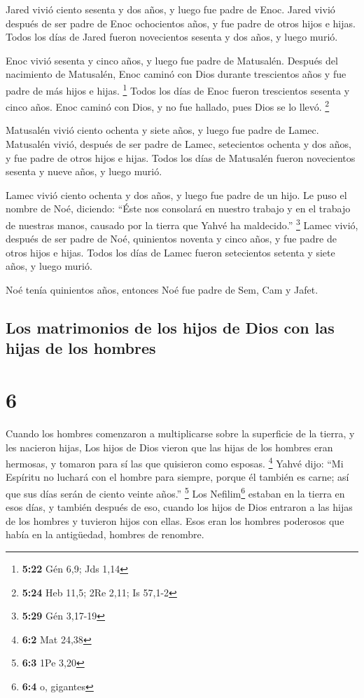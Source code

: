  Jared vivió ciento sesenta y dos años, y luego fue padre
de Enoc.  Jared vivió después de ser padre de Enoc
ochocientos años, y fue padre de otros hijos e hijas. 
Todos los días de Jared fueron novecientos sesenta y dos años, y luego
murió.

 Enoc vivió sesenta y cinco años, y luego fue padre de
Matusalén.  Después del nacimiento de Matusalén, Enoc
caminó con Dios durante trescientos años y fue padre de más hijos e
hijas. \footnote{\textbf{5:22} Gén 6,9; Jds 1,14}  Todos
los días de Enoc fueron trescientos sesenta y cinco años.
 Enoc caminó con Dios, y no fue hallado, pues Dios se lo
llevó. \footnote{\textbf{5:24} Heb 11,5; 2Re 2,11; Is 57,1-2}

 Matusalén vivió ciento ochenta y siete años, y luego fue
padre de Lamec.  Matusalén vivió, después de ser padre de
Lamec, setecientos ochenta y dos años, y fue padre de otros hijos e
hijas.  Todos los días de Matusalén fueron novecientos
sesenta y nueve años, y luego murió.

 Lamec vivió ciento ochenta y dos años, y luego fue padre
de un hijo.  Le puso el nombre de Noé, diciendo: ``Éste
nos consolará en nuestro trabajo y en el trabajo de nuestras manos,
causado por la tierra que Yahvé ha maldecido.'' \footnote{\textbf{5:29}
  Gén 3,17-19}  Lamec vivió, después de ser padre de Noé,
quinientos noventa y cinco años, y fue padre de otros hijos e hijas.
 Todos los días de Lamec fueron setecientos setenta y
siete años, y luego murió.

 Noé tenía quinientos años, entonces Noé fue padre de
Sem, Cam y Jafet.

\hypertarget{los-matrimonios-de-los-hijos-de-dios-con-las-hijas-de-los-hombres}{%
\subsection{Los matrimonios de los hijos de Dios con las hijas de los
hombres}\label{los-matrimonios-de-los-hijos-de-dios-con-las-hijas-de-los-hombres}}

\hypertarget{section-5}{%
\section{6}\label{section-5}}

 Cuando los hombres comenzaron a multiplicarse sobre la
superficie de la tierra, y les nacieron hijas,  Los hijos
de Dios vieron que las hijas de los hombres eran hermosas, y tomaron
para sí las que quisieron como esposas. \footnote{\textbf{6:2} Mat 24,38}
 Yahvé dijo: ``Mi Espíritu no luchará con el hombre para
siempre, porque él también es carne; así que sus días serán de ciento
veinte años.'' \footnote{\textbf{6:3} 1Pe 3,20}  Los
Nefilim\footnote{\textbf{6:4} o, gigantes} estaban en la tierra en esos
días, y también después de eso, cuando los hijos de Dios entraron a las
hijas de los hombres y tuvieron hijos con ellas. Esos eran los hombres
poderosos que había en la antigüedad, hombres de renombre.


